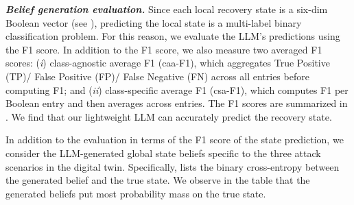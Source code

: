 \documentclass[runningheads,10pt]{llncs}
\begin{document}
\begin{table}
\begin{minipage}[t]{0.58\linewidth}
    \vspace{2em}
    \caption{Evaluation of the LLM for belief generation.}
    \label{tab:global-state-bce}
\end{minipage}
\vspace{-2em}
\end{table} 

\noindent\textit{\textbf{Belief generation evaluation.}} Since each local recovery state is a six-dim Boolean vector (see ), predicting the local state is a multi-label binary classification problem. For this reason, we evaluate the LLM's predictions using the F1 score. In addition to the F1 score, we also measure two averaged F1 scores: (\textit{i}) {class-agnostic average F1} (caa-F1), which aggregates True Positive (TP)/ False Positive (FP)/ False Negative (FN) across all entries before computing F1; and (\textit{ii}) {class-specific average F1} (csa-F1), which computes F1 per Boolean entry and then averages across entries. The F1 scores are summarized in . We find that our lightweight LLM can accurately predict the recovery state. 

In addition to the evaluation in terms of the F1 score of the state prediction, we consider the LLM-generated global state beliefs specific to the three attack scenarios in the digital twin. Specifically,  lists the binary cross-entropy between the generated belief and the true state. We observe in the table that the generated beliefs put most probability mass on the true state.
\end{document}
